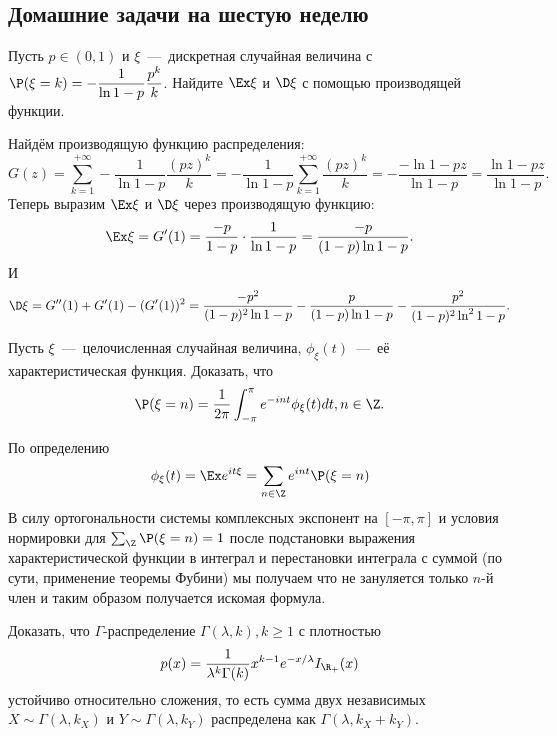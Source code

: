\subsection{Домашние задачи на шестую неделю}
\begin{problem}
    Пусть $p \in (0, 1)$ и $\xi$~---~дискретная случайная величина с $\P(\xi = k) = -\dfrac{1}{\ln 1 - p}\dfrac{p^k}{k}$.
    Найдите $\Ex\xi$ и $\D\xi$ с помощью производящей функции.
\end{problem}
\begin{solution}
    Найдём производящую функцию распределения:
    \[
        G(z) = \sum\limits_{k = 1}^{+\infty} -\dfrac{1}{\ln 1 - p} \dfrac{(pz)^k}{k} = -\dfrac{1}{\ln 1 - p}\sum\limits_{k = 1}^{+\infty} \dfrac{(pz)^k}{k} = -\dfrac{-\ln 1 - pz}{\ln 1 - p} = \dfrac{\ln 1 - pz}{\ln 1 - p}.
    \]
    Теперь выразим $\Ex \xi$ и $\D \xi$ через производящую функцию:
    \[
        \Ex \xi = G'(1) =  \dfrac{-p}{1 - p}\cdot \dfrac{1}{\ln 1 - p} = \dfrac{-p}{(1 - p)\ln 1 - p}.
    \]
    И
    \[
        \D \xi = G''(1) + G'(1) - (G'(1))^2 = \dfrac{-p^2}{(1 - p)^2\ln 1 - p} - \dfrac{p}{(1 - p)\ln 1 - p} - \dfrac{p^2}{(1 - p)^2\ln^2 1- p}.
    \]
\end{solution}
\begin{problem}
    Пусть $\xi$~---~целочисленная случайная величина, $\phi_\xi(t)$~---~её характеристическая функция. Доказать, что
    \[
        \P(\xi = n) = \dfrac{1}{2\pi}\int_{-\pi}^{\pi} e^{-int}\phi_{\xi}(t)dt, n \in \Z.
    \]
\end{problem}
\begin{solution}
    По определению
    \[
        \phi_{\xi}(t) = \Ex e^{it\xi} = \sum\limits_{n \in \Z} e^{int}\P(\xi = n)
    \]
    В силу ортогональности системы комплексных экспонент на $[-\pi, \pi]$ и условия нормировки для $\sum_\Z \P(\xi = n) = 1$ после подстановки выражения характеристической функции в интеграл и перестановки интеграла с суммой (по сути, применение теоремы Фубини) мы получаем что не зануляется только $n$-й член и таким образом получается искомая формула.
\end{solution}
\begin{problem}
    Доказать, что $\Gamma$-распределение $\Gamma(\lambda, k), k \geq 1$ с плотностью \[p(x) = \dfrac{1}{\lambda^k \Gamma(k)}x^{k - 1}e^{-x/\lambda}I_{\R_+}(x)\]
    устойчиво относительно сложения, то есть сумма двух независимых $X \sim \Gamma(\lambda, k_X)$ и $Y \sim \Gamma(\lambda, k_Y)$ распределена как $\Gamma(\lambda, k_X + k_Y)$.
\end{problem}
